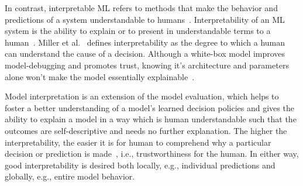 \hspace*{3.5mm} In contrast, interpretable ML refers to methods that make the behavior and predictions of a system understandable to humans~\cite{molnar2019interpretable}. 
Interpretability of an ML system is the ability to explain or to present in understandable terms to a human~\cite{doshi2017towards}. Miller et al.~\cite{XAI_miller} defines interpretability as the degree to which a human can understand the cause of a decision. Although a white-box model improves model-debugging and promotes trust, knowing it's architecture and parameters alone won't make the model essentially explainable~\cite{das2020opportunities}.  %

Model interpretation is an extension of the model evaluation, which helps to foster a better understanding of a model’s learned decision policies and gives the ability to explain a model in a way which is human understandable such that the outcomes are self-descriptive and needs no further explanation. 
The higher the interpretability, the easier it is for human to comprehend why a particular decision or prediction is made~\cite{stiglic2020interpretability,bhatt2020explainable}, i.e., trustworthiness for the human. In either way, good interpretability is desired both locally, e.g., individual predictions and globally, e.g., entire model behavior. 

